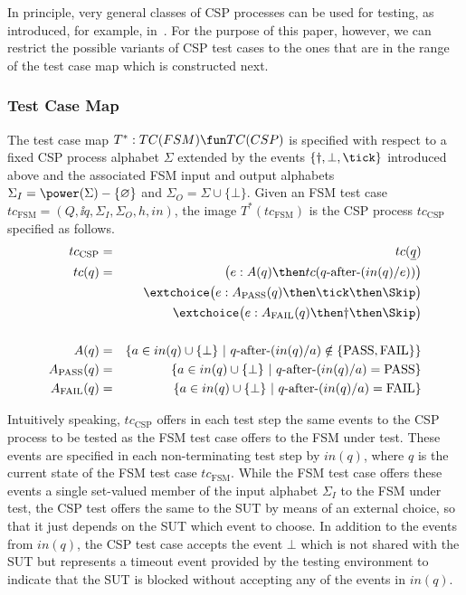  
 In principle, very general classes of CSP processes can be
 used for testing, as introduced, for example, 
 in~\cite{DBLP:conf/fm/PeleskaS96,peleska1997a}. For the purpose of this paper, however, we can restrict the possible variants of CSP test cases to the ones that are in the range of the test case map which is constructed next.


\subsubsection*{Test Case Map}

The test case map $T^* :TC(FSM) \fun TC(CSP)$ is specified with respect to a fixed
CSP process alphabet $\Sigma$ extended by the events $\{\dag,\bot,\tick \}$ introduced
above
and the associated FSM input and output alphabets
$\Sigma_I = \power(\Sigma)-\{\varnothing\}$ and $\Sigma_O=\Sigma\cup \{\bot \}$.
Given an FSM test case $tc_\text{FSM}=(Q,\ii q,\Sigma_I,\Sigma_O,h,in)$, 
the image $T^*(tc_\text{FSM})$ is the CSP process $tc_\text{CSP}$ specified 
as follows.
\begin{eqnarray*}
tc_\text{CSP} & = & tc(\ii q)
\\
tc(q) & = & \big( e :  A(q) \then  tc(q\after (in(q)/e)) \big)
\\ & & \extchoice
 \big( e : A_\text{PASS}(q)   \then \tick \then \Skip \big)
\\ & & \extchoice
 \big( e : A_\text{FAIL}(q) \then \dag \then \Skip \big)
\\ & & 
\\
A(q) & = & \{ a\in in(q)\cup\{\bot\}~|~q\after (in(q)/a)\notin \{\text{PASS},\text{FAIL}\} \}
\\
A_\text{PASS}(q) & = & \{ a\in in(q)\cup\{\bot\}~|~q\after(in(q)/a) = \text{PASS} \}
\\
A_\text{FAIL}(q) & = & \{ a\in in(q)\cup\{\bot\}~|~q\after(in(q)/a) = \text{FAIL} \}
\end{eqnarray*}

Intuitively speaking, $tc_\text{CSP}$ offers in each test step the same events to 
the CSP process to be tested as the FSM test case offers to the FSM under test. 
These events are specified in each non-terminating test step by $in(q)$, where
$q$ is the current state of the FSM test case $tc_\text{FSM}$. While the FSM test 
case offers these events a single set-valued member of the input alphabet $\Sigma_I$
to the FSM under test, the CSP test offers the same to the SUT by means of an external choice, so that it just depends on the SUT which event to choose. In addition to the
events from $in(q)$, the CSP test case 
accepts the event $\bot$ which is not shared with
the SUT but represents a timeout event provided by the testing environment to indicate
that the SUT is blocked without accepting any of the events in $in(q)$.


